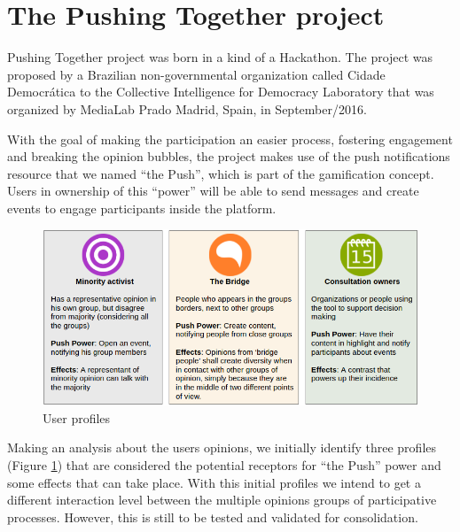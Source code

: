 \documentclass{llncs}
\begin{document}
\section{The Pushing Together project}
\label{sec:pushingtogether}

  Pushing Together project was born in a kind of a Hackathon. The project was
proposed by a Brazilian non-governmental organization called Cidade Democr\'atica
to the Collective Intelligence for Democracy Laboratory that was organized by
MediaLab Prado Madrid, Spain, in September/2016.

  With the goal of making the participation an easier process, fostering
engagement and breaking the opinion bubbles, the project makes use of the
push notifications resource that we named ``the Push'', which is part of the
gamification concept. Users in ownership of this ``power'' will be able to send
messages and create events to engage participants inside the platform.

 \begin{figure}[hbt]
   \centering
     \includegraphics[keepaspectratio=true,scale=0.45]{images/userprofiles.png}
   \caption{User profiles}
   \label{fig:userprofiles}
 \end{figure}

  Making an analysis about the users opinions, we initially identify three
profiles (Figure \ref{fig:userprofiles}) that are considered the potential
receptors for ``the Push'' power and some effects that can take place. With this
initial profiles we intend to get a different interaction level between
the multiple opinions groups of participative processes. However, this is still
to be tested and validated for consolidation.
\end{document}
